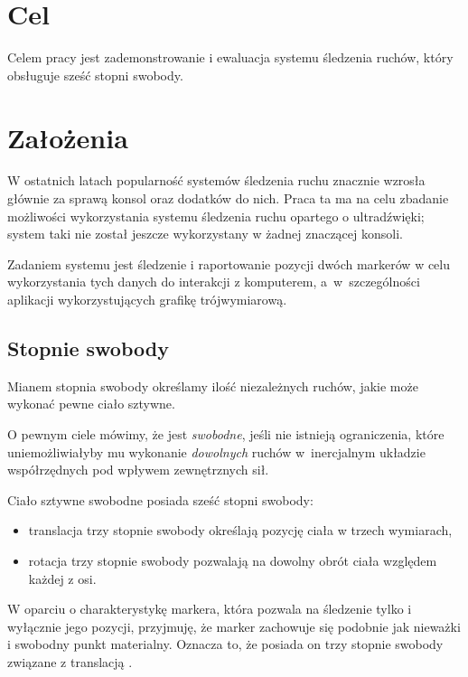 \label{ch:cele}
\section{Cel}
Celem pracy jest zademonstrowanie i ewaluacja systemu śledzenia ruchów, który obsługuje sześć stopni swobody.

\section{Założenia}
W ostatnich latach popularność systemów śledzenia ruchu znacznie wzrosła głównie za sprawą konsol oraz dodatków do nich. Praca ta ma na celu zbadanie możliwości wykorzystania systemu śledzenia ruchu opartego o ultradźwięki; system taki nie został jeszcze wykorzystany w żadnej znaczącej konsoli.

Zadaniem systemu jest śledzenie i raportowanie pozycji dwóch markerów w celu wykorzystania tych danych do interakcji z komputerem, a~w~szczególności aplikacji wykorzystujących grafikę trójwymiarową.

\subsection{Stopnie swobody}
Mianem stopnia swobody określamy ilość niezależnych ruchów, jakie może wykonać pewne ciało sztywne.

O pewnym ciele mówimy, że jest \textsl{swobodne}, jeśli nie istnieją ograniczenia, które uniemożliwiałyby mu wykonanie \textsl{dowolnych} ruchów w~inercjalnym układzie współrzędnych pod wpływem zewnętrznych sił.

Ciało sztywne swobodne posiada sześć stopni swobody:
\begin{itemize}
 \item translacja \ppauza trzy stopnie swobody określają pozycję ciała w trzech wymiarach,
 \item rotacja \ppauza trzy stopnie swobody pozwalają na dowolny obrót ciała względem każdej z osi.
\end{itemize}

W oparciu o charakterystykę markera, która pozwala na śledzenie tylko i wyłącznie jego pozycji, przyjmuję, że marker zachowuje się podobnie jak nieważki i swobodny punkt materialny. Oznacza to, że posiada on trzy stopnie swobody związane z translacją \citep{WrZa76}.

